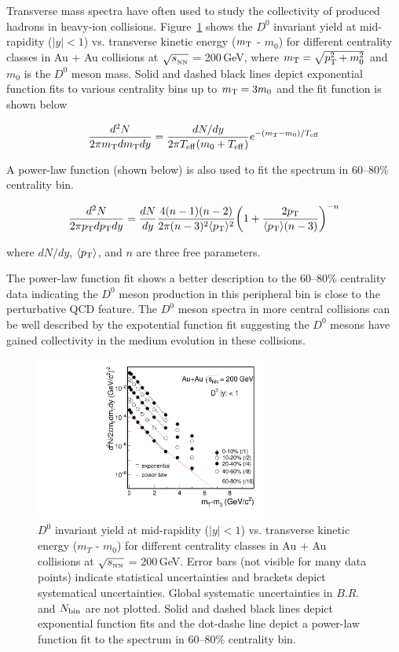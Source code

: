 Transverse mass spectra have often used to study the collectivity of produced hadrons in heavy-ion collisions. Figure~\ref{mTFit_D0} shows the $D^{0}$ invariant yield at mid-rapidity ($|y|<1$) vs. transverse kinetic energy ($m_{\rm T}$ - $m_{0}$) for different centrality classes in Au + Au collisions at $\sqrt{s_{_{\rm NN}}}$ = 200\,GeV, where $m_{\rm T} = \sqrt{p_{\rm T}^2+m_0^2}$ and $m_0$ is the $D^0$ meson mass. Solid and dashed black lines depict exponential function fits to various centrality bins up to $m_{\rm T} = 3m_{0}$ and the fit function is shown below

\begin{equation}
\frac{d^2N}{2\pi m_{\rm T}dm_{\rm T}dy} = \frac{dN/dy}{2\pi T_{\rm eff}(m_0+T_{\rm eff})}e^{-(m_{\rm T}-m_0)/T_{\rm eff}}
\end{equation}

A power-law function (shown below) is also used to fit the spectrum in 60--80\% centrality bin. 

\begin{equation}
\frac{d^2N}{2\pi p_{\rm T}dp_{\rm T}dy} = \frac{dN}{dy}\frac{4(n-1)(n-2)}{2\pi (n-3)^2\langle p_{\rm T} \rangle ^2}\bigg(1+\frac{2p_{\rm T}}{\langle p_{\rm T} \rangle (n-3)}\bigg)^{-n}
\end{equation}

where $dN/dy$, $\langle p_{\rm T}\rangle$, and $n$ are three free parameters. 

The power-law function fit shows a better description to the 60--80\% centrality data indicating the $D^0$ meson production in this peripheral bin is close to the perturbative QCD feature. The $D^0$ meson spectra in more central collisions can be well described by the expotential function fit suggesting the $D^0$ mesons have gained collectivity in the medium evolution in these collisions.

\begin{figure}
\centering
\includegraphics[width=0.68\textwidth]{figure/Run14_D0HFT/mTFit_D0.pdf}
\caption{$D^{0}$ invariant yield at mid-rapidity ($|y|<1$) vs. transverse kinetic energy ($m_{T}$ - $m_{0}$) for different centrality classes in Au + Au collisions at $\sqrt{s_{_{\rm NN}}}$ = 200\,GeV. Error bars (not visible for many data points) indicate statistical uncertainties and brackets depict systematical uncertainties. Global systematic uncertainties in $B.R.$ and $N_{\rm bin}$ are not plotted. Solid and dashed black lines depict exponential function fits and the dot-dashe line depict a power-law function fit to the spectrum in 60--80\% centrality bin.}
\label{mTFit_D0} 
\end{figure}

